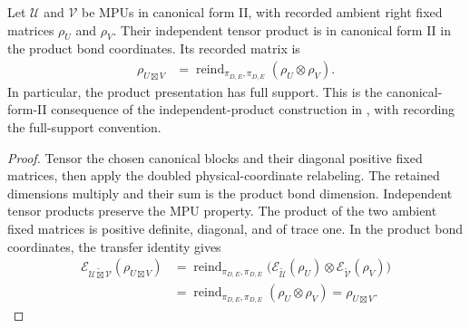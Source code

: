 \begin{lemma}
    \label{thm:mpu_canonical_form_ii_tensor_product}
    \leanok
    Let $\mathcal U$ and $\mathcal V$ be MPUs in canonical form II,
    with recorded ambient right fixed matrices $\rho_U$ and $\rho_V$. Their
    independent tensor product is in canonical form II in the product bond
    coordinates. Its recorded matrix is
    \begin{align}
        \rho_{U\boxtimes V}
         & =\operatorname{reind}_{\pi_{D,E},\pi_{D,E}}
        (\rho_U\otimes\rho_V).
    \end{align}
    In particular, the product presentation has full support. This is the
    canonical-form-II consequence of the independent-product construction in
    \cite[Theorem~IV.6(ii)]{Cirac2017MPU}, with \cite{gap:mpu_canonical_form_full_support} recording the full-support
    convention.
\end{lemma}

\begin{proof}\leanok
    Tensor the chosen canonical blocks and their diagonal positive fixed
    matrices, then apply the doubled physical-coordinate relabeling. The
    retained dimensions multiply and their sum is the product bond dimension.
    Independent tensor products preserve the MPU property. The product of the
    two ambient fixed matrices is positive definite, diagonal, and of trace
    one. In the product bond coordinates, the transfer identity gives
    \begin{align}
        \mathcal E_{\widetilde{\mathcal U\boxtimes\mathcal V}}(\rho_{U\boxtimes V})
         & =\operatorname{reind}_{\pi_{D,E},\pi_{D,E}}
        \bigl(\mathcal E_{\widetilde{\mathcal U}}(\rho_U)
        \otimes\mathcal E_{\widetilde{\mathcal V}}(\rho_V)\bigr)            \\
         & =\operatorname{reind}_{\pi_{D,E},\pi_{D,E}}(\rho_U\otimes\rho_V)
        =\rho_{U\boxtimes V}.
    \end{align}
\end{proof}

